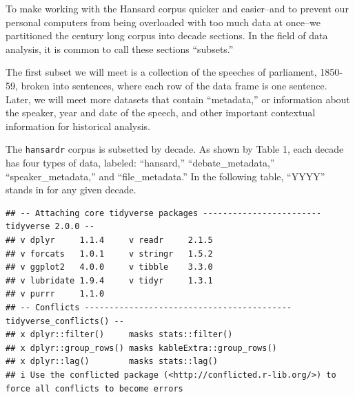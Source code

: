 \documentclass[
]{article}
\begin{document}
To make working with the Hansard corpus quicker and easier--and to
prevent our personal computers from being overloaded with too much data
at once--we partitioned the century long corpus into decade sections. In
the field of data analysis, it is common to call these sections
``subsets.''

The first subset we will meet is a collection of the speeches of
parliament, 1850-59, broken into sentences, where each row of the data
frame is one sentence. Later, we will meet more datasets that contain
``metadata,'' or information about the speaker, year and date of the
speech, and other important contextual information for historical
analysis.

The \texttt{hansardr} corpus is subsetted by decade. As shown by Table
1, each decade has four types of data, labeled: ``hansard,''
``debate\_metadata,'' ``speaker\_metadata,'' and ``file\_metadata.'' In
the following table, ``YYYY'' stands in for any given decade.

\begin{verbatim}
## -- Attaching core tidyverse packages ------------------------ tidyverse 2.0.0 --
## v dplyr     1.1.4     v readr     2.1.5
## v forcats   1.0.1     v stringr   1.5.2
## v ggplot2   4.0.0     v tibble    3.3.0
## v lubridate 1.9.4     v tidyr     1.3.1
## v purrr     1.1.0     
## -- Conflicts ------------------------------------------ tidyverse_conflicts() --
## x dplyr::filter()     masks stats::filter()
## x dplyr::group_rows() masks kableExtra::group_rows()
## x dplyr::lag()        masks stats::lag()
## i Use the conflicted package (<http://conflicted.r-lib.org/>) to force all conflicts to become errors
\end{verbatim}
\end{document}

